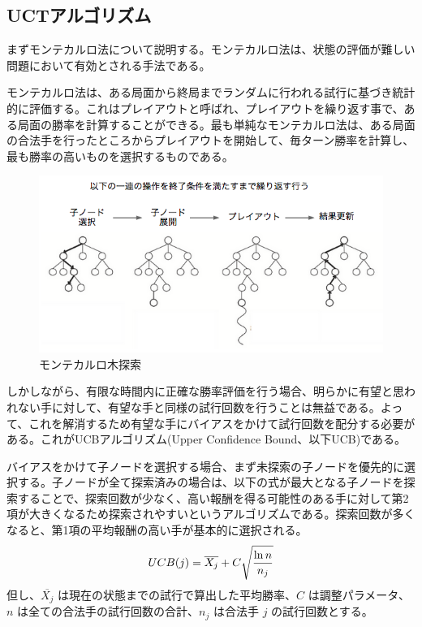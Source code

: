 \documentclass[a4, 10pt,dvipdfmx]{jsarticle}
\begin{document}
\subsection{UCTアルゴリズム}

まずモンテカルロ法について説明する。モンテカルロ法は、状態の評価が難しい問題において有効とされる手法である。

モンテカルロ法は、ある局面から終局までランダムに行われる試行に基づき統計的に評価する。これはプレイアウトと呼ばれ、プレイアウトを繰り返す事で、ある局面の勝率を計算することができる。最も単純なモンテカルロ法は、ある局面の合法手を行ったところからプレイアウトを開始して、毎ターン勝率を計算し、最も勝率の高いものを選択するものである。

\begin{figure}[b]
    \begin{center}
      \includegraphics[width=120mm]{img/monte_carlo.png}
    \end{center}
    \caption{モンテカルロ木探索~\cite{kocsis2006bandit}}
    \label{monte_carlo}
\end{figure}

しかしながら、有限な時間内に正確な勝率評価を行う場合、明らかに有望と思われない手に対して、有望な手と同様の試行回数を行うことは無益である。よって、これを解消するため有望な手にバイアスをかけて試行回数を配分する必要がある。これがUCBアルゴリズム(Upper Confidence Bound、以下UCB)である。 


バイアスをかけて子ノードを選択する場合、まず未探索の子ノードを優先的に選択する。子ノードが全て探索済みの場合は、以下の式が最大となる子ノードを探索することで、探索回数が少なく、高い報酬を得る可能性のある手に対して第2項が大きくなるため探索されやすいというアルゴリズムである。探索回数が多くなると、第1項の平均報酬の高い手が基本的に選択される。
\begin{equation}
  UCB(j)=\overline{X_j} + C\sqrt{\mathstrut \frac{\ln{n}}{n_j}}
\end{equation}
但し、$\overline{X_j}$ は現在の状態までの試行で算出した平均勝率、$C$ は調整パラメータ、$n$ は全ての合法手の試行回数の合計、$n_j$ は合法手 $j$ の試行回数とする。
\end{document}
